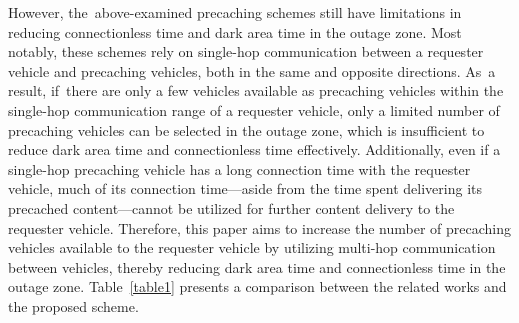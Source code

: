 \documentclass[electronics,aricle,accept,pdftex,moreauthors]{Definitions/mdpi}
\begin{document}
However, the~above-examined precaching schemes still have limitations in reducing connectionless time and dark area time in the outage zone. Most notably, these schemes rely on single-hop communication between a requester vehicle and precaching vehicles, both in the same and opposite directions. As~a result, if~there are only a few vehicles available as precaching vehicles within the single-hop communication range of a requester vehicle, only a limited number of precaching vehicles can be selected in the outage zone, which is insufficient to reduce dark area time and connectionless time effectively.
Additionally, even if a single-hop precaching vehicle has a long connection time with the requester vehicle, much of its connection time—aside from the time spent delivering its precached content---cannot be utilized for further content delivery to the requester vehicle.
Therefore, this paper aims to increase the number of precaching vehicles available to the requester vehicle by utilizing multi-hop communication between vehicles, thereby reducing dark area time and connectionless time in the outage zone. Table~\ref{table1} presents a comparison between the related works and the proposed scheme.
\end{document}
